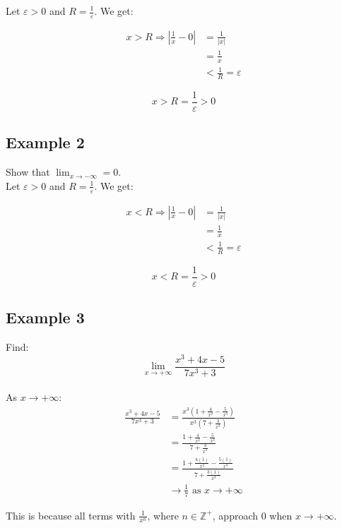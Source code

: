 \documentclass[11pt]{article}
\begin{document}
Let \(\varepsilon > 0\) and \(R = \frac{1}{\varepsilon}\). We get:

\begin{align*}
x > R \Rightarrow \left|\frac{1}{x} - 0 \right| &= \frac{1}{|x|} \\
&= \frac{1}{x} \\
&< \frac{1}{R} = \varepsilon
\end{align*}

\[x > R = \frac{1}{\varepsilon} > 0\]

\newpage

\subsection{Example 2}
\label{sec:org64fc32e}
Show that \(\lim_{x \rightarrow - \infty} = 0\).
\\[0pt]

Let \(\varepsilon > 0\) and \(R = \frac{1}{\varepsilon}\). We get:

\begin{align*}
x < R \Rightarrow \left|\frac{1}{x} - 0 \right| &= \frac{1}{|x|} \\
&= \frac{1}{x} \\
&< \frac{1}{R} = \varepsilon
\end{align*}

\[x < R = \frac{1}{\varepsilon} > 0\]

\subsection{Example 3}
\label{sec:org80d99ed}
Find:
\[\lim_{x \rightarrow + \infty} \frac{x^3 + 4x -5}{7x^3 + 3}\]
\\[0pt]

As \(x \rightarrow + \infty\):
\begin{align*}
\frac{x^3 + 4x - 5}{7x^3 + 3} &=
\frac{x^3 \left(1 + \frac{4}{x^2} - \frac{5}{x^3} \right)}
{x^3 \left( 7 + \frac{3}{x^3}\right)} \\
&= \frac{1 + \frac{4}{x^2} - \frac{5}{x^3}}
{7 + \frac{3}{x^3}} \\
&= \frac{1 + \frac{4(1)}{x^2} - \frac{5(1)}{x^3}}
{7 + \frac{3(1)}{x^3}} \\
&\rightarrow \frac{1}{7} \text{ as } x \rightarrow +\infty
\end{align*}

This is because all terms with \(\frac{1}{x^n}\), where \(n \in \mathbb{Z}^+\), approach 0 when \(x \rightarrow + \infty\).
\\[0pt]
\end{document}
